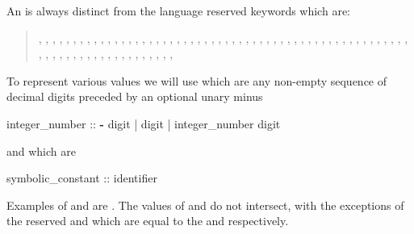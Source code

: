 %
An  is always distinct from the \nusmv language
reserved keywords which are: \label{list of reserved words}\\
\begin{quote}
%
, ,
, 
, , ,
, ,
, , , 
,
, , ,
,
, , ,
, , , ,
, , , ,
, , ,
, , , ,
, , 
,
, , , ,
,
, , , ,
, , , , ,
, , , , ,
, , , ,
, , , ,
, , , ,
, , , ,
, , 
\end{quote}

To represent various values we will use 
which are any non-empty sequence of decimal digits preceded by an
optional unary minus

\begin{Grammar}
integer_number ::
        \textbf{-} digit
      | digit
      | integer_number digit			
\end{Grammar}

\noindent and  which are 

\begin{Grammar}
  symbolic_constant :: identifier
\end{Grammar}

Examples of  and 
are . 
%
The values of  and  do not intersect, with the exceptions of the reserved
  and 
which are equal to the   and 
respectively.


